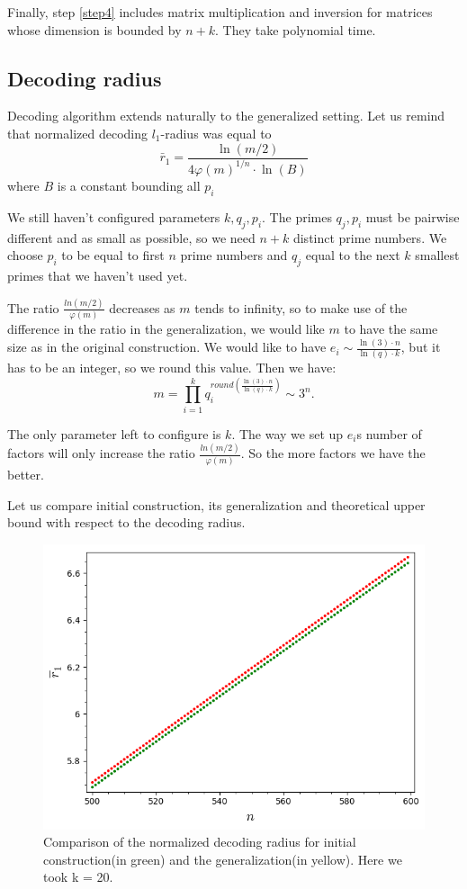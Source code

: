 \documentclass[12pt]{article}
\begin{document}
Finally, step \ref{step4} includes matrix multiplication and inversion for matrices whose dimension is bounded by $n + k$. They take polynomial time.


\subsection{Decoding radius}
\label{subsec:radius_integers}


Decoding algorithm extends naturally to the generalized setting. Let us remind that normalized decoding $l_{1}$-radius was equal to
\[
    \bar r_{1} = \frac{\ln(m/2)}{4 \varphi(m)^{1/n} \cdot \ln(B)}
\]
where $B$ is a constant bounding all $p_{i}$

We still haven't configured parameters $k, q_{j}, p_{i}$. The primes $q_{j}, p_{i}$ must be pairwise different and as small as possible, so we need $n+k$ distinct prime numbers. We choose $p_{i}$ to be equal to first $n$ prime numbers and $q_{j}$ equal to the next $k$ smallest primes that we haven't used yet.

The ratio $\frac{ln(m/2)}{\varphi(m)}$ decreases as $m$ tends to infinity, so to make use of the difference in the ratio in the generalization, we would like $m$ to have the same size as in the original construction. We would like to have $e_i \sim \frac{\ln(3) \cdot n}{\ln(q) \cdot k}$, but it has to be an integer, so we round this value. Then we have:
\[
    m = \prod_{i = 1}^{k} q_i^{round(\frac{\ln(3) \cdot n}{\ln(q) \cdot k})} \sim 3^n .
\]

The only parameter left to configure is $k$. The way we set up $e_i$s number of factors will only increase the ratio $\frac{ln(m/2)}{\varphi(m)}$. So the more factors we have the better.

Let us compare initial construction, its generalization and theoretical upper bound with respect to the decoding radius.

\begin{figure}
  \includegraphics[width=\linewidth]{plot4.png}
  \caption{Comparison of the normalized decoding radius for initial construction(in green) and the generalization(in yellow). Here we took k = 20. }
  \label{fig:gen_int}
\end{figure}
\end{document}
